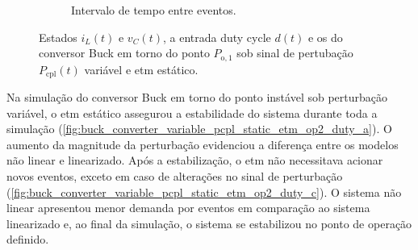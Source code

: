 \begin{figure}[H]
\begin{subfigure}{1.\textwidth}
    \caption{Intervalo de tempo entre eventos.}
    \label{fig:buck_converter_variable_pcpl_static_etm_op1_duty_c}
  \end{subfigure}
  \caption{Estados $i_L(t)$ e $v_C(t)$, a entrada duty cycle $d(t)$ e os  do conversor Buck em torno do ponto $P_{\mathrm{o}, 1}$ sob sinal de pertubação $P_{\mathrm{cpl}}(t)$ variável e \acrshort{etm} estático.}
\end{figure}

Na simulação do conversor Buck em torno do ponto instável sob perturbação variável, o \acrshort{etm} estático assegurou a estabilidade do sistema durante toda a simulação (\autoref{fig:buck_converter_variable_pcpl_static_etm_op2_duty_a}). O aumento da magnitude da perturbação evidenciou a diferença entre os modelos não linear e linearizado. Após a estabilização, o \acrshort{etm} não necessitava acionar novos eventos, exceto em caso de alterações no sinal de perturbação (\autoref{fig:buck_converter_variable_pcpl_static_etm_op2_duty_c}). O sistema não linear apresentou menor demanda por eventos em comparação ao sistema linearizado e, ao final da simulação, o sistema se estabilizou no ponto de operação definido.

